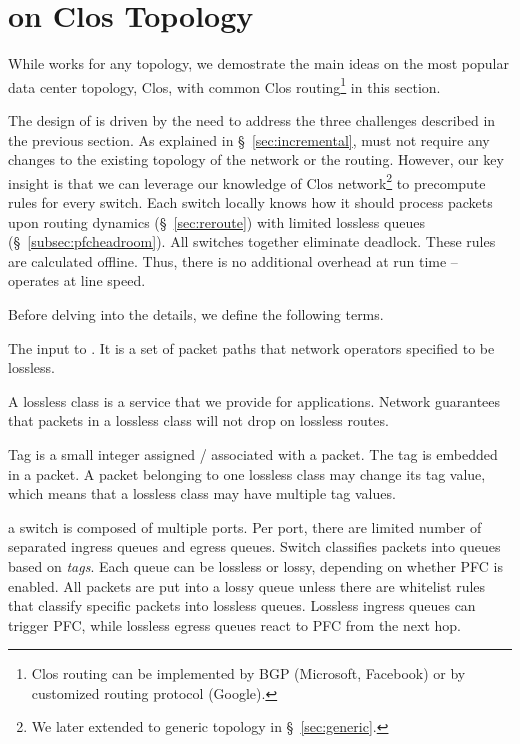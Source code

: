 \section{\sysname{} on Clos Topology}\label{sec:specific}

While \sysname{} works for any topology, we demostrate the main ideas on the most popular data center 
topology, Clos, with common Clos routing\footnote{Clos routing can be implemented by BGP (Microsoft, 
Facebook) or by customized routing protocol (Google).} in this section. 

The design of \sysname{} is driven by the need to address the three challenges described 
in the previous section. As explained in \S~\ref{sec:incremental}, \sysname{} must  
not require any changes to the existing topology of the 
network or the routing. However, our key insight is that we can leverage our knowledge of 
Clos network\footnote{We later extended \sysname{} to generic topology in \S~\ref{sec:generic}.}
to precompute rules for every switch. Each switch locally knows how it should process 
packets upon routing dynamics (\S~\ref{sec:reroute}) with limited lossless queues
(\S~\ref{subsec:pfcheadroom}). All switches together eliminate deadlock.
These rules are calculated offline. Thus, there is no additional overhead at run 
time -- \sysname{} operates at line speed.

Before delving into the details, we define the following terms.

 The input to \sysname{}. It is a set of packet paths that network 
operators specified to be lossless.

 A lossless class is a service that we provide for applications. 
Network guarantees that packets in a lossless class will not drop on lossless routes. 

 Tag is a small integer assigned / associated with a packet. The tag is embedded 
in a packet. A packet belonging to one lossless class may change its tag value, which means 
that a lossless class may have multiple tag values. 

 a switch is composed of multiple ports. 
Per port, there are limited number of separated ingress queues and egress queues. 
Switch classifies packets into queues based on {\em tags}. 
Each queue can be lossless or lossy, depending on whether PFC is enabled.
All packets are put into a lossy queue unless there are whitelist rules that classify
specific packets into lossless queues. Lossless ingress queues can trigger PFC, 
while lossless egress queues react to PFC from the next hop.


